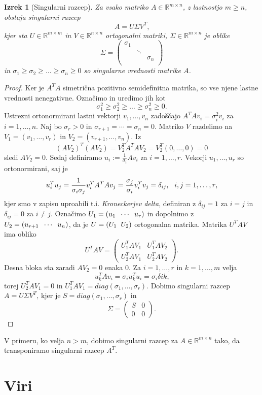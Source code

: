 \documentclass[mat1]{article}
\newtheorem{izrek}{Izrek}
\begin{document}
\begin{izrek}[Singularni razcep]
\label{izrek:SVD} Za vsako matriko $A \in \mathbb{R}^{m \times n}$, z lastnostjo $m \geq n$, obstaja singularni razcep 
$$A = U \Sigma V^T \text{,}$$
kjer sta $U \in \mathbb{R}^{m \times m}$ in $V \in \mathbb{R}^{n \times n}$ ortogonalni matriki, $\Sigma \in \mathbb{R}^{m \times n}$ je oblike
$$
\Sigma = 
\begin{pmatrix} 
\sigma_1 &  & \\
 & \ddots & \\
 & & \sigma_n  \\
 & & 
\end{pmatrix}$$
in $\sigma_1 \geq \sigma_2 \geq \ldots \geq \sigma_n \geq 0$ so singularne vrednosti matrike $A$.
\end{izrek}
\begin{proof}
Ker je $A^TA$ simetrična pozitivno semidefinitna matrika, so vse njene lastne vrednosti nenegativne. Označimo in uredimo jih kot
$$\sigma_1^2 \geq \sigma_2^2 \geq \ldots \geq \sigma_n^2 \geq 0 \text{.}$$
Ustrezni ortonormirani lastni vektorji $v_1, \ldots, v_n$ zadoščajo
$A^T A v_i = \sigma_i^2 v_i$ za $i = 1, \ldots, n \text{.}$
Naj bo $\sigma_r > 0$ in $\sigma_{r+1} = \cdots = \sigma_n = 0 \text{.}$
Matriko $V$ razdelimo na $V_1 = 
\left( v_1, \ldots, v_r
\right)$ in $V_2 = 
\left( v_{r+1}, \ldots, v_n
\right) \text{.}$ Iz
$$ (AV_2)^T (AV_2) = V_2^T A^T A V_2 = V_2^T \left( 0, \ldots, 0 \right) = 0
$$
sledi $AV_2 = 0 \text{.}$ Sedaj definiramo $u_i := \frac{1}{\sigma_i} Av_i$ za $i = 1, \ldots, r \text{.}$
Vekorji $u_1, \ldots, u_r$ so ortonormirani, saj je
$$ u_i^T u_j = \frac{1}{\sigma_i \sigma_j} v_i^T A^T A v_j = \frac{\sigma_j}{\sigma_i} v_i^T v_j = \delta_{ij} \text{,} \hspace{3mm} i,j = 1, \ldots, r \text{,}
$$
kjer smo v zapisu uproabili t.i. \emph{Kroneckerjev delta}, definiran z $\delta_{ij} = 1$ za $i = j$ in $\delta_{ij} = 0$ za $i \neq j$. Označimo 
$U_1 = 
\left( u_1 \hspace{2mm} \cdots \hspace{2mm} u_r
\right)$ in dopolnimo z $U_2 = 
\left( u_{r+1} \hspace{2mm} \cdots \hspace{2mm} u_n
\right)$, da je $ U = \left( U_1 \hspace{2mm} U_2 \right)$ ortogonalna matrika. Matrika $U^T A V$ ima obliko 
$$
U^T A V = 
\begin{pmatrix} 
U_1^T A V_1 & U_1^T A V_2 \\
U_2^T A V_1 & U_2^T A V_2
\end{pmatrix}
\text{.}
$$
Desna bloka sta zaradi $AV_2 = 0$ enaka $0$. Za $i = 1, \ldots, r$ in $k = 1, \ldots, m$ velja
$$ u_k^T A v_i = \sigma_i u_k^T u_i = \sigma_i \delta{ik} \text{,}
$$
torej $U_2^T A V_1 = 0$ in $U_1^T A V_1 = diag(\sigma_1, \ldots, \sigma_r) \text{.}$ Dobimo singularni razcep $A = U \Sigma V^T \text{,}$ kjer je $S = diag(\sigma_1, \ldots, \sigma_r)$ in 
$$ \Sigma = 
\begin{pmatrix} 
S & 0 \\
0 & 0
\end{pmatrix}
\text{.}$$

\end{proof}
V primeru, ko velja $n>m$, dobimo singularni razcep za $A \in \mathbb{R}^{m \times n}$ tako, da transponiramo singularni razcep $A^T$.
\section{Viri}
\end{document}
